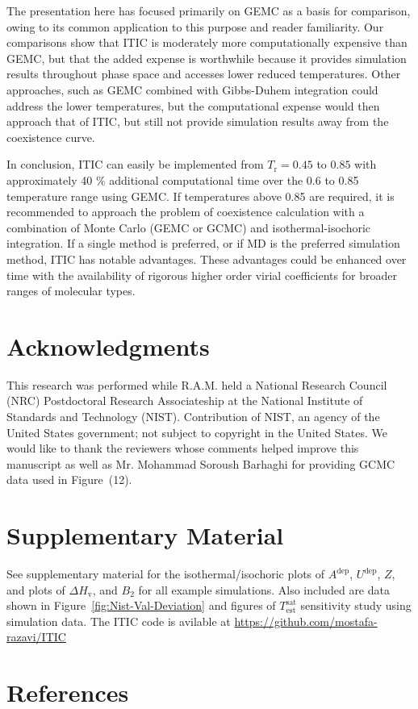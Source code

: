 \documentclass[5p,times]{elsarticle}
\begin{document}
The presentation here has focused primarily on GEMC as a basis for comparison, owing to its common application to this purpose and reader familiarity. Our comparisons show that ITIC is moderately more computationally expensive than GEMC, but that the added expense is worthwhile because it provides simulation results throughout phase space and accesses lower reduced temperatures. Other approaches, such as GEMC combined with Gibbs-Duhem integration could address the lower temperatures, but the computational expense would then approach that of ITIC, but still not provide simulation results away from the coexistence curve.


In conclusion, ITIC can easily be implemented from $T_\mathrm{r} = 0.45$ to $0.85$ with approximately 40 \% additional computational time over the 0.6 to 0.85 temperature range using GEMC. If temperatures above 0.85 are required, it is recommended to approach the problem of coexistence calculation with a combination of Monte Carlo (GEMC or GCMC) and isothermal-isochoric integration. If a single method is preferred, or if MD is the preferred simulation method, ITIC has notable advantages. These advantages could be enhanced over time with the availability of rigorous higher order virial coefficients for broader ranges of molecular types. 

\section{Acknowledgments}

This research was performed while R.A.M. held a National Research Council (NRC) Postdoctoral Research Associateship at the National Institute of Standards and Technology (NIST). Contribution of NIST, an agency of the United States government; not subject to copyright in the United States. We would like to thank the reviewers whose comments helped improve this manuscript as well as Mr. Mohammad Soroush Barhaghi for providing GCMC data used in Figure~(12).

\section{Supplementary Material} \label{sec:SupMat} 
See supplementary material for 
the isothermal/isochoric plots of $A^{\mathrm{dep}}$, $U^{\mathrm{dep}}$, $Z$, and plots of $\Delta H_{\mathrm{v}}$, and $B_2$ for all example simulations. Also included are data shown in Figure~\ref{fig:Nist-Val-Deviation} and figures of $T^\mathrm{sat}_\mathrm{est}$ sensitivity study using simulation data. The ITIC code is avilable at \url{https://github.com/mostafa-razavi/ITIC}


\section{References} \label{sec:ref} 



\end{document}
